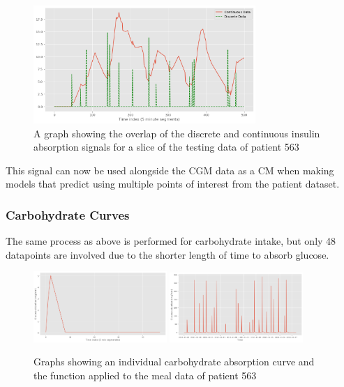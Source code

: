           \begin{figure}[H]
            \centering
            \includegraphics[width=0.75\textwidth]{images/InsulinDB.png} 
            \caption{
             A graph showing the overlap of the discrete and continuous insulin absorption signals for a slice of the testing data of patient 563
            }
          \end{figure}

          This signal can now be used alongside the CGM data as a CM when making models that predict using multiple points of interest from the patient dataset.

          \subsubsection{Carbohydrate Curves}

          The same process as above is performed for carbohydrate intake, but only 48 datapoints are involved due to the shorter length of time to absorb glucose.

          \begin{figure}[H]
            \centering

            \includegraphics[width=0.45\textwidth]{images/CarbsSM.png} 
            \includegraphics[width=0.45\textwidth]{images/CarbsLG.png} 
            \caption{
             Graphs showing an individual carbohydrate absorption curve and the function applied to the meal data of patient 563
            }
          \end{figure}

